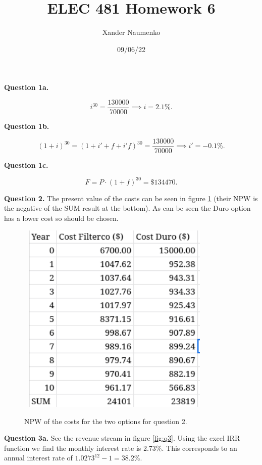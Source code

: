 \documentclass[letterpaper, reqno,11pt]{article}
\begin{document}
\title{ELEC 481 Homework 6}
\date{09/06/22}
\author{Xander Naumenko}
\maketitle

{\noindent\bf Question 1a.} 

\[
i^{30}=\frac{130000}{70000}\implies i=2.1\%
.\]

{\noindent\bf Question 1b.} 

\[
    (1+i)^{30}=\left( 1+i'+f+i'f \right)^{30}=\frac{130000}{70000}\implies i'=-0.1\%
.\]

{\noindent\bf Question 1c.} 

\[
F=P \cdot (1+f)^{30}=\$134470
.\]

{\noindent\bf Question 2.} The present value of the costs can be seen in figure \ref{fig:q2} (their NPW is the negative of the SUM result at the bottom). As can be seen the Duro option has a lower cost so should be chosen. 

\begin{figure}[htpb]
    \centering
    \includegraphics[width=0.8\textwidth]{q2}
    \caption{NPW of the costs for the two options for question 2. }
    \label{fig:q2}
\end{figure}

{\noindent\bf Question 3a.} See the revenue stream in figure \ref{fig:q3}. Using the excel IRR function we find the monthly interest rate is 2.73\%. This corresponds to an annual interest rate of $1.0273^{12}-1=38.2\%$. 
\end{document}
